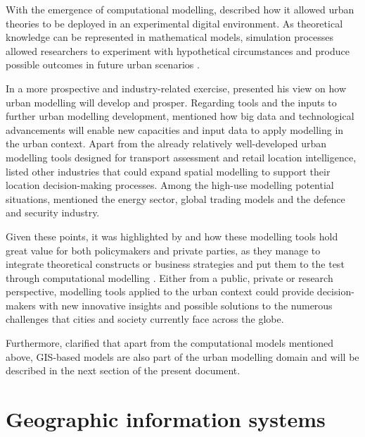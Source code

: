 \documentclass[12pt, a4paper]{report}
\begin{document}
With the emergence of computational modelling, \cite{battyUrbanModeling2009a} described how it allowed urban theories to be deployed in an experimental digital environment. As theoretical knowledge can be represented in mathematical models, simulation processes allowed researchers to experiment with hypothetical circumstances and produce possible outcomes in future urban scenarios \citep{battyUrbanModeling2009a}.


In a more prospective and industry-related exercise, \cite{wilsonFutureUrbanModelling2018} presented his view on how urban modelling will develop and prosper. Regarding tools and the inputs to further urban modelling development, \cite{wilsonFutureUrbanModelling2018} mentioned how big data and technological advancements will enable new capacities and input data to apply modelling in the urban context. Apart from the already relatively well-developed urban modelling tools designed for transport assessment and retail location intelligence, \cite{wilsonFutureUrbanModelling2018} listed other industries that could expand spatial modelling to support their location decision-making processes. Among the high-use modelling potential situations, \cite{wilsonFutureUrbanModelling2018} mentioned the energy sector, global trading models and the defence and security industry.


Given these points, it was highlighted by \cite{battyUrbanModeling2009a} and \cite{wilsonFutureUrbanModelling2018} how these modelling tools hold great value for both policymakers and private parties, as they manage to integrate theoretical constructs or business strategies and put them to the test through computational modelling \citep{battyUrbanModeling2009a}. Either from a public, private or research perspective, modelling tools applied to the urban context could provide decision-makers with new innovative insights and possible solutions to the numerous challenges that cities and society currently face across the globe.

Furthermore, \cite{battyUrbanModeling2009a} clarified that apart from the computational models mentioned above, GIS-based models are also part of the urban modelling domain and will be described in the next section of the present document.


\section{Geographic information systems}
\end{document}
